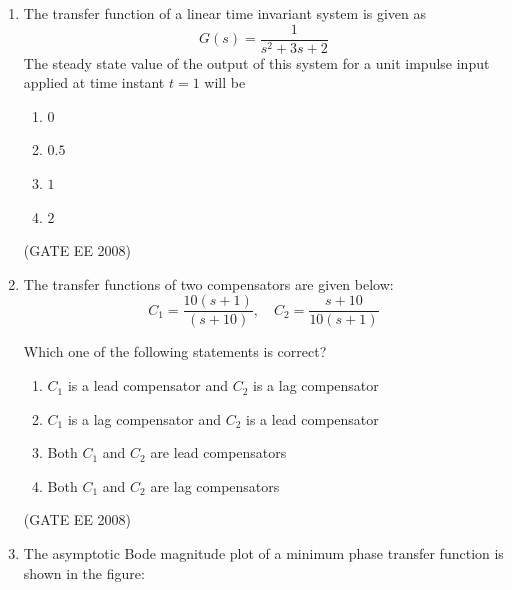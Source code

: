 \documentclass[journal,12pt,onecolumn]{IEEEtran}
\theoremstyle{remark}
\begin{document}
\begin{enumerate}[start=1, label=Q.\arabic*]
The average voltage across the load and the average current through the diode will respectively be

\begin{multicols}{4}
\begin{enumerate}[label=(\Alph*)]
    \item $10$ V, $2$ A
    \item $10$ V, $8$ A
    \item $40$ V, $2$ A
    \item $40$ V, $8$ A
\end{enumerate}
\end{multicols}
\hfill (GATE EE 2008)


\item The transfer function of a linear time invariant system is given as
$$
G(s)=\frac{1}{s^2+3s+2}
$$
The steady state value of the output of this system for a unit impulse input applied at time instant $t=1$ will be

\begin{multicols}{4}
\begin{enumerate}[label=(\Alph*)]
    \item $0$
    \item $0.5$
    \item $1$
    \item $2$
\end{enumerate}
\end{multicols}
\hfill (GATE EE 2008)


\item The transfer functions of two compensators are given below:
$$
C_1 = \frac{10(s+1)}{(s+10)}, \quad C_2 = \frac{s+10}{10(s+1)}
$$

Which one of the following statements is correct?
\begin{enumerate}[label=(\Alph*)]
    \item $C_1$ is a lead compensator and $C_2$ is a lag compensator
    \item $C_1$ is a lag compensator and $C_2$ is a lead compensator
    \item Both $C_1$ and $C_2$ are lead compensators
    \item Both $C_1$ and $C_2$ are lag compensators
\end{enumerate}
\hfill (GATE EE 2008)


\item The asymptotic Bode magnitude plot of a minimum phase transfer function is shown in the figure:


\end{enumerate}
\end{document}
